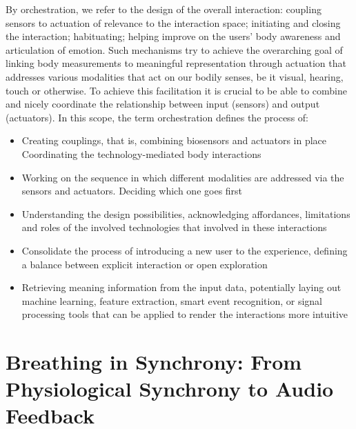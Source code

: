 By orchestration, we refer to the design of the overall interaction: coupling sensors to actuation of relevance to the interaction space; initiating and closing the interaction; habituating; helping improve on the users' body awareness and articulation of emotion. Such mechanisms try to achieve the overarching goal of linking body measurements to meaningful representation through actuation that addresses various modalities that act on our bodily senses, be it visual, hearing, touch or otherwise. To achieve this facilitation it is crucial to be able to combine and nicely coordinate the relationship between input (sensors) and output (actuators). In this scope, the term orchestration defines the process of:
\begin{itemize}
    \item Creating couplings, that is, combining biosensors and actuators in place
    Coordinating the technology-mediated body interactions
    \item Working on the sequence in which different modalities are addressed via the sensors and actuators. Deciding which one goes first
    \item Understanding the design possibilities, acknowledging affordances, limitations and roles of the involved technologies that involved in these interactions
    \item Consolidate the process of introducing a new user to the experience, defining a balance between explicit interaction or open exploration
    \item Retrieving meaning information from the input data, potentially laying out machine learning, feature extraction, smart event recognition, or signal processing tools that can be applied to render the interactions more intuitive
\end{itemize}

\section{Breathing in Synchrony: From Physiological Synchrony to Audio Feedback}
\label{sec:breathing_synchrony}

